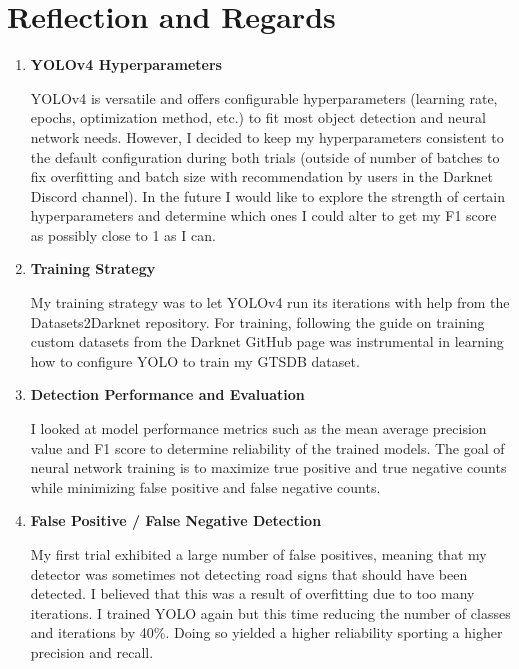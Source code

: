 \documentclass{article}
\begin{document}
        \pagebreak
        \section{Reflection and Regards}
    
        \begin{enumerate}
            
            \item \textbf{YOLOv4 Hyperparameters}
            
            YOLOv4 is versatile and offers configurable hyperparameters (learning rate, epochs, optimization method, etc.) to fit most object detection and neural network needs. However, I decided to keep my hyperparameters consistent to the default configuration during both trials (outside of number of batches to fix overfitting and batch size with recommendation by users in the Darknet Discord channel). In the future I would like to explore the strength of certain hyperparameters and determine which ones I could alter to get my F1 score as possibly close to 1 as I can. 
            
            \item \textbf{Training Strategy}
            
            My training strategy was to let YOLOv4 run its iterations with help from the Datasets2Darknet repository. For training, following the guide on training custom datasets from the Darknet GitHub page was instrumental in learning how to configure YOLO to train my GTSDB dataset.
            
            \item \textbf{Detection Performance and Evaluation}
            
            I looked at model performance metrics such as the mean average precision value and F1 score to determine reliability of the trained models. The goal of neural network training is to maximize true positive and true negative counts while minimizing false positive and false negative counts. 
            
            \item \textbf{False Positive / False Negative Detection}
            
            My first trial exhibited a large number of false positives, meaning that my detector was sometimes not detecting road signs that should have been detected. I believed that this was a result of overfitting due to too many iterations. I trained YOLO again but this time reducing the number of classes and iterations by 40\%. Doing so yielded a higher reliability sporting a higher precision and recall.
            

\end{enumerate}
\end{document}
